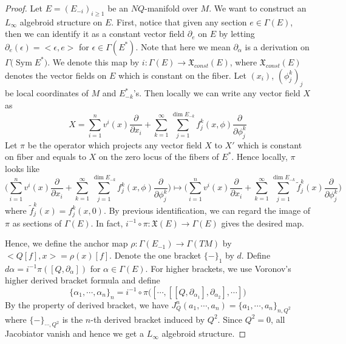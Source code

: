 \documentclass[12pt]{amsart}
\theoremstyle{definition}
\theoremstyle{remark}
\numberwithin{equation}{section}
\newcommand{\del}{\partial}
\renewcommand{\del}{\partial}
\newcommand{\1}{{\mathbb{1}}}
\newcommand{\sym}{\operatorname{Sym}}
\begin{document}
\begin{proof}
Let $E=(E_{-i})_{i\ge 1}$ be an $NQ$-manifold over $M$. We want to construct an $L_{\infty}$ algebroid structure on $E$.  First, notice that given any section $e\in \Gamma (E)$, then we can identify it as a constant vector field $\partial_{e}$ on $E$ by letting $\partial_{e}(\epsilon)=<\epsilon,e>$ for $\epsilon\in \Gamma(E^*)$. Note that here we mean $\partial_{\alpha}$ is a derivation on $\Gamma \big(\sym E^* \big)$. We denote this map by $i: \Gamma(E) \to \mathfrak{X}_{const}(E)$, where $\mathfrak{X}_{const}(E)$ denotes the vector fields on $E$ which is constant on the fiber. Let $(x_i)$, $(\phi_j^k)_j$ be local coordinates of $M$ and $E_{-k}^*$'s. Then locally we can write any vector field $X$ as 
\begin{equation*}
X=\sum_{i=1}^n v^i(x) \frac{\del }{\del x_i}+ \sum_{k=1}^{\infty}\sum_{j=1}^{\dim E_{-k}}f_{j}^k(x,\phi) \frac{\del}{\del \phi_j^k}
\end{equation*}
Let $\pi$ be the operator which projects any vector field $X$ to $X'$ which is constant on fiber and equals to $X$ on the zero locus of the fibers of $E^*$. Hence locally, $\pi$ looks like
\begin{equation*}
\bigg(\sum_{i=1}^n v^i(x) \frac{\del }{\del x_i}+ \sum_{k=1}^{\infty}\sum_{j=1}^{\dim E_{-k}}f_{j}^k(x,\phi) \frac{\del}{\del \phi_j^k}\bigg) \mapsto \bigg(\sum_{i=1}^n v^i(x) \frac{\del }{\del x_i}+ \sum_{k=1}^{\infty}\sum_{j=1}^{\dim E_{-k}}\tilde{f}_{j}^k(x) \frac{\del}{\del \phi_j^k} \bigg)
\end{equation*}
where $\tilde{f}_{j}^k(x)= {f}_{j}^k(x,0)$.
By previous identification, we can regard the image of $\pi$ as sections of $\Gamma (E)$. In fact, $i^{-1}\circ \pi: \mathfrak{X}(E) \to \Gamma(E)$ gives the desired map.

Hence, we define the anchor map $\rho:\Gamma(E_{-1})\to \Gamma(TM)$ by $<Q[f],x>=\rho(x)[f]$. Denote the one bracket $\{-\}_1$ by $d$. Define $d\alpha=i^{-1}\pi([Q,\del_{\alpha}])$ for $\alpha \in \Gamma(E)$. For higher brackets, we use Voronov's higher derived bracket formula and define 
\begin{equation*}
\{ \alpha_1, \cdots ,\alpha_n\}_n=i^{-1}\circ \pi \Big([\cdots,[[Q,\del_{\alpha_1}],\del_{\alpha_2}], \cdots ]\Big)
\end{equation*}
By the property of derived bracket, we have $J^n_Q(a_1,\cdots, a_n)=\{a_1,\cdots ,a_n \}_{n, Q^2}$ where $\{-\}_{\cdots, Q^2}$ is the $n$-th derived bracket induced by $Q^2$. Since $Q^2=0$, all Jacobiator vanish and hence we get a $L_{\infty}$ algebroid structure.


\end{proof}
\end{document}
